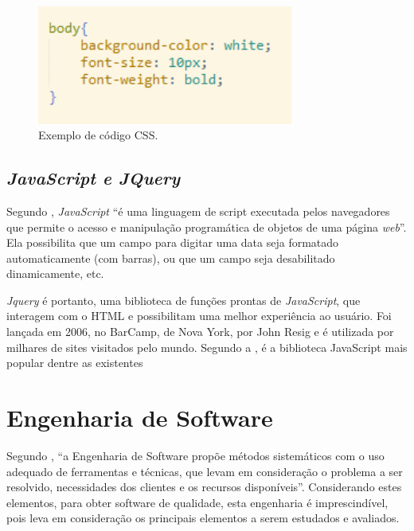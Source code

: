 \documentclass[
	12pt,				%
    oneside,			%
	a4paper,			%
	english,			%
	french,				%
	spanish,			%
	brazil,				%
	]{abntex2}
\begin{document}
\begin{figure} [hbt] 
\label{figura1} 
\caption{Exemplo de código CSS.}
\begin{center}
\includegraphics[width=0.75\textwidth]{excss.png}
\end{center}
\end{figure}

\subsection{\textit{JavaScript e JQuery}}

Segundo , \textit{JavaScript} “é uma linguagem de script executada pelos
navegadores que permite o acesso e manipulação programática de objetos de uma
página \textit{web}”. Ela possibilita que um campo para digitar uma data seja formatado
automaticamente (com barras), ou que um campo seja desabilitado dinamicamente,
etc. 

\textit{Jquery} é portanto, uma biblioteca de funções prontas de \textit{JavaScript}, que
interagem com o HTML e possibilitam uma melhor experiência ao usuário. Foi lançada
em 2006, no BarCamp, de Nova York, por John Resig e é utilizada por milhares de
sites visitados pelo mundo. Segundo a , é a biblioteca JavaScript
mais popular dentre as existentes

\section{Engenharia de Software}
Segundo , “a Engenharia de Software propõe métodos
sistemáticos com o uso adequado de ferramentas e técnicas, que levam em
consideração o problema a ser resolvido, necessidades dos clientes e os recursos
disponíveis”. Considerando estes elementos, para obter software de qualidade, esta
engenharia é imprescindível, pois leva em consideração os principais elementos a
serem estudados e avaliados.
\end{document}

